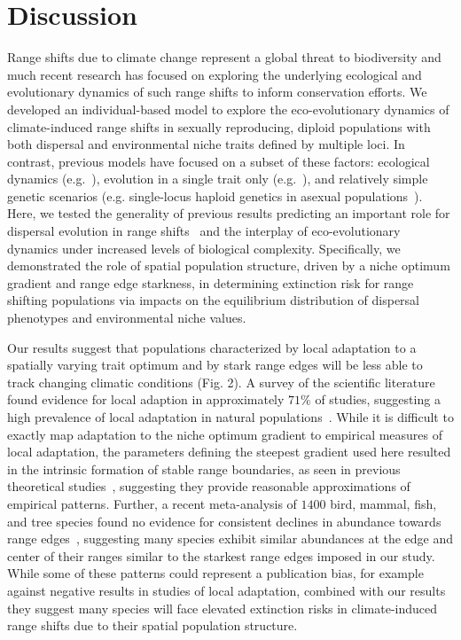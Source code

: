 \documentclass[11pt]{article}
\begin{document}
\section*{Discussion}
Range shifts due to climate change represent a global threat to biodiversity and much recent research has focused on exploring the underlying ecological and evolutionary dynamics of such range shifts to inform conservation efforts. We developed an individual-based model to explore the eco-evolutionary dynamics of climate-induced range shifts in sexually reproducing, diploid populations with both dispersal and environmental niche traits defined by multiple loci. In contrast, previous models have focused on a subset of these factors: ecological dynamics (e.g.~\citep{brooker2007modelling}), evolution in a single trait only (e.g.~\citep{atkins2010local, henry2013eco}), and relatively simple genetic scenarios (e.g. single-locus haploid genetics in asexual populations~\citep{boeye2013more, hargreaves2015fitness}).  Here, we tested the generality of previous results predicting an important role for dispersal evolution in range shifts~\citep{boeye2013more, henry2013eco} and the interplay of eco-evolutionary dynamics under increased levels of biological complexity. Specifically, we demonstrated the role of spatial population structure, driven by a niche optimum gradient and range edge starkness, in determining extinction risk for range shifting populations via impacts on the equilibrium distribution of dispersal phenotypes and environmental niche values.

Our results suggest that populations characterized by local adaptation to a spatially varying trait optimum and by stark range edges will be less able to track changing climatic conditions (Fig. 2). A survey of the scientific literature found evidence for local adaption in approximately $71\%$ of studies, suggesting a high prevalence of local adaptation in natural populations~\citep{hereford2009quantitative}. While it is difficult to exactly map adaptation to the niche optimum gradient to empirical measures of local adaptation, the parameters defining the steepest gradient used here resulted in the intrinsic formation of stable range boundaries, as seen in previous theoretical studies~\citep{kirkpatrick1997evolution, alleaume2006geographical, polechova2015limits, polechova2018sky}, suggesting they provide reasonable approximations of empirical patterns. Further, a recent meta-analysis of $1400$ bird, mammal, fish, and tree species found no evidence for consistent declines in abundance towards range edges~\citep{dallas2017species}, suggesting many species exhibit similar abundances at the edge and center of their ranges similar to the starkest range edges imposed in our study. While some of these patterns could represent a publication bias, for example against negative results in studies of local adaptation, combined with our results they suggest many species will face elevated extinction risks in climate-induced range shifts due to their spatial population structure.
\end{document}
